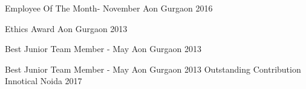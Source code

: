 



\begin{cvhonors}

  \cvhonor
    {Employee Of The Month- November} %
    {Aon} %
    {Gurgaon} %
    {2016} %

  \cvhonor
    {Ethics Award} %
    {Aon} %
    {Gurgaon} %
    {2013} %

  \cvhonor
    {Best Junior Team Member - May} %
    {Aon} %
    {Gurgaon} %
    {2013} %

  \cvhonor
    {Best Junior Team Member - May} %
    {Aon} %
    {Gurgaon} %
    {2013} %
  \cvhonor
    {Outstanding Contribution} %
    {Innotical} %
    {Noida} %
    {2017} %


\end{cvhonors}

